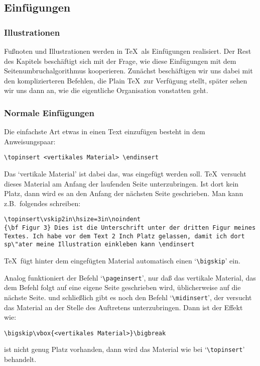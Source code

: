 \subsection{Einf\"ugungen}
\subsubsection{Illustrationen}
Fu\ss{}noten und Illustrationen werden in \TeX\ als Einf\"ugungen
realisiert. Der Rest des Kapitels besch\"af\-tigt sich mit der Frage, wie
diese Einf\"ugungen mit dem Seitenumbruchalgorithmus kooperieren.
Zun\"achst besch\"aftigen wir uns dabei mit den komplizierteren Befehlen,
die Plain \TeX\ zur Verf\"ugung stellt, sp\"ater sehen wir uns dann an,
wie die eigentliche Organisation vonstatten geht.
\subsubsection{Normale Einf\"ugungen}
Die einfachste Art etwas in einen Text einzuf\"ugen besteht in dem
Anweisungspaar:
\begin{verbatim}
\topinsert <vertikales Material> \endinsert
\end{verbatim}
Das `vertikale Material' ist dabei das, was eingef\"ugt werden soll.
\TeX\ versucht dieses Material am Anfang der laufenden Seite
unterzubringen. Ist dort kein Platz, dann wird es an den Anfang der
n\"achsten Seite geschrieben. Man kann z.B.\ folgendes schreiben:
\begin{verbatim}
\topinsert\vskip2in\hsize=3in\noindent
{\bf Figur 3} Dies ist die Unterschrift unter der dritten Figur meines
Textes. Ich habe vor dem Text 2 Inch Platz gelassen, damit ich dort
sp\"ater meine Illustration einkleben kann \endinsert
\end{verbatim}
\TeX\ f\"ugt hinter dem eingef\"ugten Material automatisch einen
`\verb|\bigskip|' ein.

Analog funktioniert der Befehl
`\verb|\pageinsert|', nur da\ss{} das
vertikale Material, das dem Befehl folgt auf eine eigene Seite
geschrieben wird, \"ublicherweise auf die n\"achste Seite. und schlie\ss{}lich
gibt es noch den Befehl 
`\verb|\midinsert|', der versucht das Material
an der Stelle des Auftretens unterzubringen. Dann ist der Effekt wie:
\begin{verbatim}
\bigskip\vbox{<vertikales Material>}\bigbreak
\end{verbatim}
ist nicht genug Platz vorhanden, dann wird das Material wie bei
`\verb|\topinsert|' behandelt.

